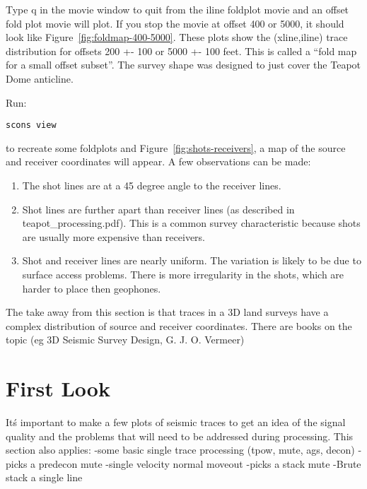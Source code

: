 Type q in the movie window to quit from the iline foldplot movie and an offset fold plot movie will plot.  If you stop the movie at offset 400 or 5000, it should look like Figure~\ref{fig:foldmap-400-5000}.  These plots show the (xline,iline) trace distribution for offsets 200 +- 100 or 5000 +- 100 feet.  This is called a “fold map for a small offset subset”.  The survey shape was designed to just cover the Teapot Dome anticline.

Run:
\begin{verbatim}   
scons view
\end{verbatim}

to recreate some foldplots and Figure~\ref{fig:shots-receivers}, a map of the source and receiver coordinates will appear.  A few observations can be made:
\begin{enumerate}
\item The shot lines are at a 45 degree angle to the receiver lines.  
\item Shot lines are further apart than receiver lines (as described in teapot\_processing.pdf).  This is a common survey characteristic because shots are usually more expensive than receivers.
\item Shot and receiver lines are nearly uniform.  The variation is likely to be due to surface access problems.  There is more irregularity in the shots, which are harder to place then geophones.
\end{enumerate}

The take away from this section is that traces in a 3D land surveys have a complex distribution of source and receiver coordinates.  There are books on the topic (eg 3D Seismic Survey Design, G. J. O. Vermeer)





\section{First Look}
It\'s important to make a few plots of seismic traces to get an idea of the signal quality and the problems that will need to be addressed during processing.   This section also applies: 
-some basic single trace processing (tpow, mute, ags, decon)
-picks a predecon mute
-single velocity normal moveout
-picks a stack mute
-Brute stack a single line

